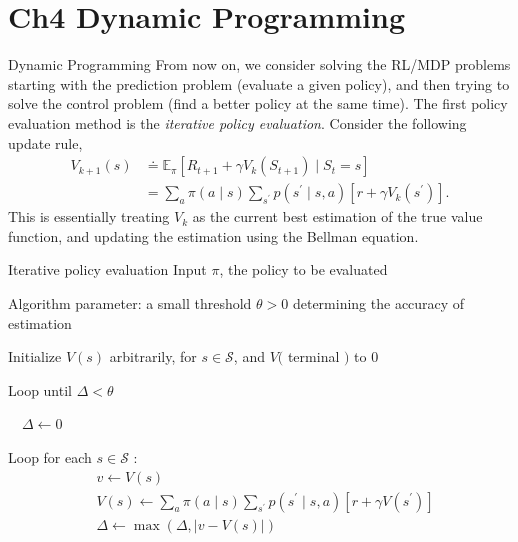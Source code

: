 \documentclass[handout]{beamer}
\begin{document}
\section{Ch4 Dynamic Programming}
\begin{frame}{Dynamic Programming}
    From now on, we consider solving the RL/MDP problems starting with the prediction problem (evaluate a given policy), and then trying to solve the control problem (find a better policy at the same time).
    The first policy evaluation method is the \textit{iterative policy evaluation}. Consider the following update rule,
    \begin{equation}
    \begin{aligned}
    V_{k+1}(s) & \doteq \mathbb{E}_{\pi}\left[R_{t+1}+\gamma V_{k}\left(S_{t+1}\right) \mid S_{t}=s\right] \\
    &=\sum_{a} \pi(a \mid s) \sum_{s^{\prime}} p\left(s^{\prime} \mid s, a\right)\left[r+\gamma V_{k}\left(s^{\prime}\right)\right].
    \end{aligned}
    \end{equation}
    This is essentially treating $V_k$ as the current best estimation of the true value function, and updating the estimation using the Bellman equation.
\end{frame}
\begin{frame}{Iterative policy evaluation}
Input $\pi$, the policy to be evaluated

Algorithm parameter: a small threshold $\theta>0$ determining the accuracy of estimation 

Initialize $V(s)$ arbitrarily, for $s \in \mathcal{S}$, and $V($ terminal $)$ to 0

Loop until $\Delta<\theta$

$\quad \Delta \leftarrow 0$

\quad Loop for each $s \in \mathcal{S}$ :
\begin{equation*}
\begin{aligned}
&v \leftarrow V(s) \\
&V(s) \leftarrow \sum_{a} \pi(a \mid s) \sum_{s^{\prime}} p\left(s^{\prime} \mid s, a\right)\left[r+\gamma V\left(s^{\prime}\right)\right] \\
&\Delta \leftarrow \max (\Delta,|v-V(s)|)
\end{aligned}
\end{equation*}

\end{frame}
\end{document}
